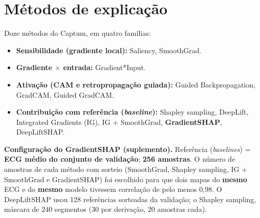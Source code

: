 \documentclass[11pt,a4paper]{article}
\begin{document}
\section{Métodos de explicação}
Doze métodos do Captum, em quatro famílias:
\begin{itemize}
\item \textbf{Sensibilidade (gradiente local):} Saliency, SmoothGrad.
\item \textbf{Gradiente $\times$ entrada:} Gradient*Input.
\item \textbf{Ativação (CAM e retropropagação guiada):} Guided Backpropagation, GradCAM, Guided GradCAM.
\item \textbf{Contribuição com referência (\textit{baseline}):} Shapley sampling, DeepLift, Integrated Gradients (IG), IG + SmoothGrad, \textbf{GradientSHAP}, DeepLiftSHAP.
\end{itemize}
\textbf{Configuração do GradientSHAP (suplemento).} Referência (\textit{baselines}) = \textbf{ECG médio do conjunto de validação}; \textbf{256 amostras}. O número de amostras de cada método com sorteio (SmoothGrad, Shapley sampling, IG + SmoothGrad e GradientSHAP) foi escolhido para que dois mapas do \textbf{mesmo} ECG e do \textbf{mesmo} modelo tivessem correlação de pelo menos 0,98. O DeepLiftSHAP usou 128 referências sorteadas da validação; o Shapley sampling, máscara de 240 segmentos (30 por derivação, 20 amostras cada).
\end{document}
